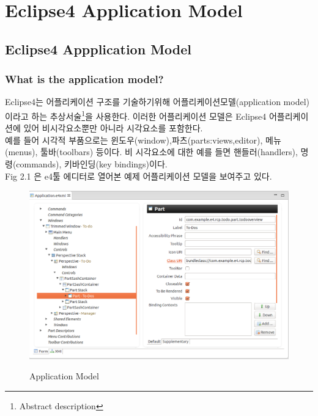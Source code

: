 %
%
%
\chapter{Eclipse4 Application Model}
\label{intro} %




\section{Eclipse4 Appplication Model}
\label{sec:1}

\subsection{What is the application model?}
Eclipse4는 어플리케이션 구조를 기술하기위해 어플리케이션모델(application model)이라고 하는 추상서술\footnote{Abstract description}을 사용한다. 이러한 어플리케이션 모델은 Eclipse4 어플리케이션에 있어 비시각요소뿐만 아니라 시각요소를 포함한다. \\

예를 들어 시각적 부품으로는 윈도우(window),파츠(parts:views,editor), 메뉴(menus), 툴바(toolbars) 등이다. 비 시각요소에 대한 예를 들면 핸들러(handlers), 명령(commands), 키바인딩(key bindings)이다. \\

Fig 2.1 은 e4툴 에디터로 열어본 예제 어플리케이션 모델을 보여주고 있다. \\

\begin{figure}[hbt]
\centering
\includegraphics[scale=.32]{./image/e4_001}
\label{fig:1}       %
\captionsetup{justification=centering}
\caption{Application Model}
\end{figure}

